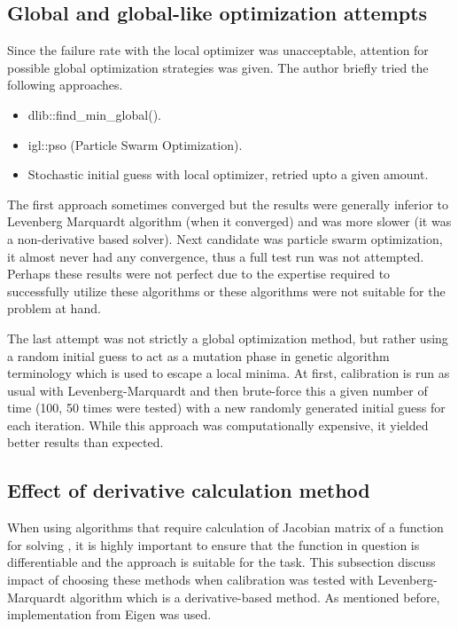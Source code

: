 \documentclass[english, printversion, nomenclature, notitle]{tuvisionthesis} %
\makeatletter
\renewcommand{\todo}[2][]{\tikzexternaldisable\@todo[#1]{#2}\tikzexternalenable}
\makeatother
\begin{document}
\subsection{Global and global-like optimization attempts}
\label{subsec:global_global_like}
Since the failure rate with the local optimizer was unacceptable, attention for possible global optimization strategies was given. The author briefly tried the following approaches.
\begin{itemize}
	\item dlib::find\_min\_global(). \todo{cite}
	\item igl::pso (Particle Swarm Optimization). \todo{cite?}
	\item Stochastic initial guess with local optimizer, retried upto a given amount.
\end{itemize}

The first approach sometimes converged but the results were generally inferior to Levenberg Marquardt algorithm (when it converged) and was more slower (it was a non-derivative based solver). Next candidate was particle swarm optimization, it almost never had any convergence, thus a full test run was not attempted. Perhaps these results were not perfect due to the expertise required to successfully utilize these algorithms or these algorithms were not suitable for the problem at hand.

The last attempt was not strictly a global optimization method, but rather using a random initial guess to act as a mutation phase in genetic algorithm terminology which is used to escape a local minima.\todo{cite genetic} At first, calibration is run as usual with Levenberg-Marquardt and then brute-force this a given number of time (100, 50 times were tested) with a new randomly generated initial guess for each iteration. While this approach was computationally expensive, it yielded better results than expected.

\subsection{Effect of derivative calculation method}
When using algorithms that require calculation of Jacobian matrix of a function for solving \todo{cite}, it is highly important to ensure that the function in question is differentiable and the approach is suitable for the task. This subsection discuss impact of choosing these methods when calibration was tested with Levenberg-Marquardt algorithm which is a derivative-based method. As mentioned before, implementation from Eigen was used.
\end{document}
